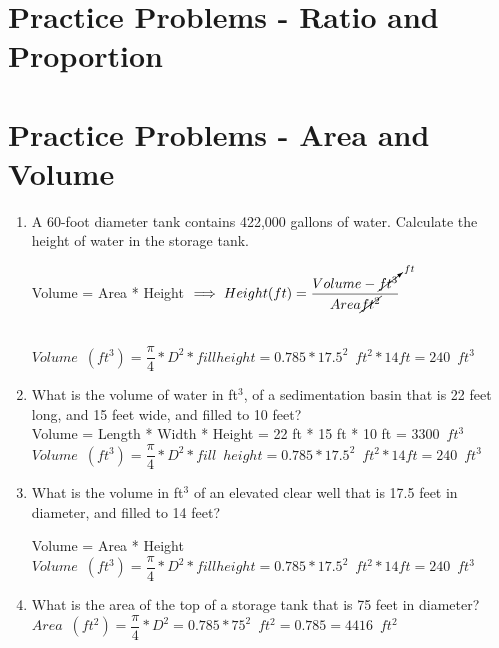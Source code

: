 \section*{Practice Problems - Ratio and Proportion}


\section*{Practice Problems - Area and Volume}
\begin{enumerate}
\item A 60-foot diameter tank contains 422,000 gallons of water. Calculate the height of water in the storage tank.

Volume = Area * Height $\implies Height (ft) =\dfrac{Volume - \cancelto{ft}{ft^3}}{Area \cancel{ft^2}}$\\
\vspace{0.2cm}
\

$ Volume \enspace (ft^3) = \dfrac{\pi}{4}*D^2 * fill height = 0.785*17.5^2 \enspace ft^2 * 14 ft=\boxed{240\enspace ft^3}$


\item What is the volume of water in ft$^3$, of a sedimentation basin that is 22 feet long, and 15 feet wide, and filled to 10 feet?\\

Volume = Length * Width * Height = 22 ft * 15 ft * 10 ft = $\boxed{3300 \enspace ft^3}$\\
\vspace{0.2cm}
$ Volume \enspace (ft^3) = \dfrac{\pi}{4}*D^2 * fill \enspace height = 0.785*17.5^2 \enspace ft^2 * 14 ft=\boxed{240\enspace ft^3}$

\item What is the volume in ft$^3$ of an elevated clear well that is 17.5 feet in diameter, and filled to 14 feet?

Volume = Area * Height\\
\vspace{0.2cm}
$ Volume \enspace (ft^3) = \dfrac{\pi}{4}*D^2 * fill height = 0.785*17.5^2 \enspace ft^2 * 14 ft=\boxed{240\enspace ft^3}$

\item What is the area of the top of a storage tank that is 75 feet in diameter?\\

$Area \enspace (ft^2)= \dfrac{\pi}{4}*D^2= 0.785*75^2 \enspace ft^2=0.785 = \boxed{4416\enspace ft^2}$\\
\vspace{0.2cm}


\end{enumerate}
